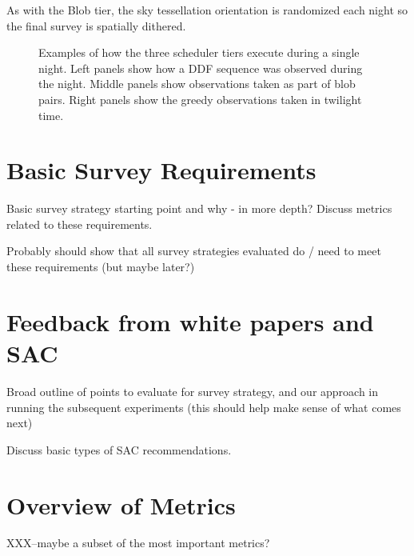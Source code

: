 As with the Blob tier, the sky tessellation orientation is randomized each night so the final survey is spatially dithered. 



\begin{figure}

\caption{Examples of how the three scheduler tiers execute during a single night. Left panels show how a DDF sequence was observed during the night. Middle panels show observations taken as part of blob pairs. Right panels show the greedy observations taken in twilight time.} \label{fig:examplenight}
\end{figure}

\section{Basic Survey Requirements}
Basic survey strategy starting point and why - in more depth? Discuss metrics related to these requirements. 

Probably should show that all survey strategies evaluated do / need to meet these requirements (but maybe later?)

\section{Feedback from white papers and SAC} 
Broad outline of points to evaluate for survey strategy, and our approach in running the subsequent experiments (this should help make sense of what comes next)

Discuss basic types of SAC recommendations. 

\section{Overview of Metrics}
XXX--maybe a subset of the most important metrics? 
%

